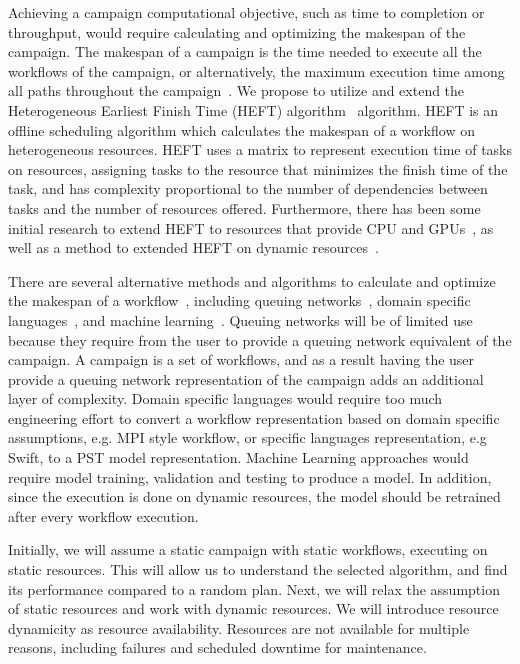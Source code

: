 Achieving a campaign computational objective, such as time to completion or throughput, would require calculating and optimizing the makespan of the campaign.
The makespan of a campaign is the time needed to execute all the workflows of the campaign, or alternatively, the maximum execution time among all paths throughout the campaign~\cite{chirkin2017execution}.
We propose to utilize and extend the Heterogeneous Earliest Finish Time (HEFT) algorithm~\cite{topcuoglu2002performance} algorithm.
HEFT is an offline scheduling algorithm which calculates the makespan of a workflow on heterogeneous resources.
HEFT uses a matrix to represent execution time of tasks on resources, assigning tasks to the resource that minimizes the finish time of the task, and has complexity proportional to the number of dependencies between tasks and the number of resources offered.
Furthermore, there has been some initial research to extend HEFT to resources that provide CPU and GPUs~\cite{shetti2013optimization}, as well as a method to extended HEFT on dynamic resources~\cite{dong2007pfas}.

There are several alternative methods and algorithms to calculate and optimize the makespan of a workflow~\cite{lu2019review}, including queuing networks~\cite{yao2019throughput,bao2019performance}, domain specific languages~\cite{carothers2017durango,maheshwari2016workflow}, and machine learning~\cite{witt2019predictive,pumma2017runtime}.
Queuing networks will be of limited use because they require from the user to provide a queuing network equivalent of the campaign.
A campaign is a set of workflows, and as a result having the user provide a queuing network representation of the campaign adds an additional layer of complexity.
Domain specific languages would require too much engineering effort to convert a workflow representation based on domain specific assumptions, e.g. MPI style workflow, or specific languages representation, e.g Swift, to a PST model representation.
Machine Learning approaches would require model training, validation and testing to produce a model.
In addition, since the execution is done on dynamic resources, the model should be retrained after every workflow execution.

Initially, we will assume a static campaign with static workflows, executing on static resources. 
This will allow us to understand the selected algorithm, and find its performance compared to a random plan.
Next, we will relax the assumption of static resources and work with dynamic resources.
We will introduce resource dynamicity as resource availability.
Resources are not available for multiple reasons, including failures and scheduled downtime for maintenance.

